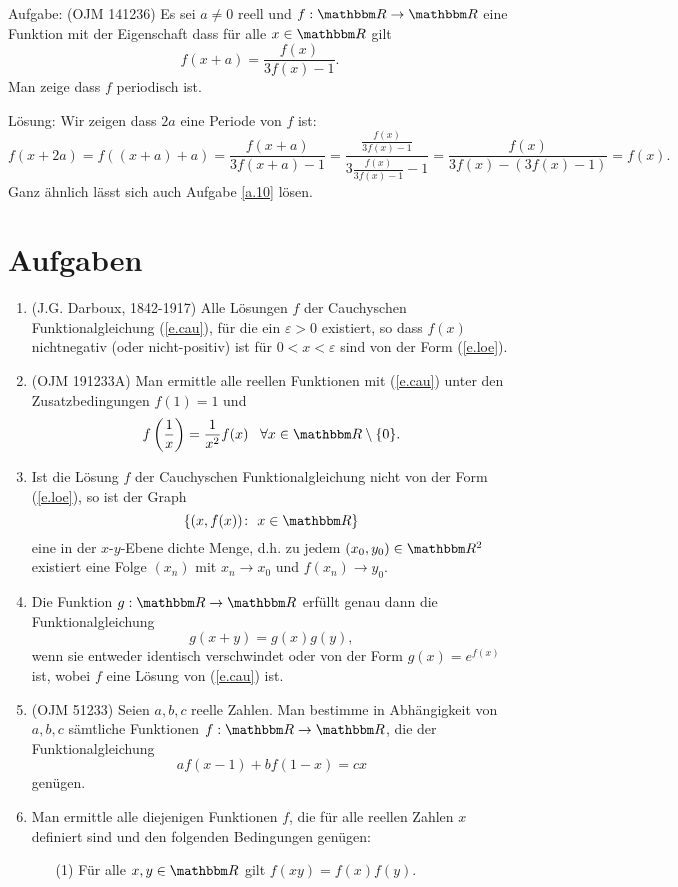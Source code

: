 \documentclass[11pt]{article}
\begin{document}
\noindent Aufgabe: (OJM 141236) Es sei $a\neq 0$ reell und $f:\R\to\R$ eine
Funktion mit der Eigenschaft da{ss} f\"{u}r alle $x\in\R$ gilt
\[f(x+a)=\frac{f(x)}{3f(x)-1}.\]
Man zeige  da{ss} $f$ periodisch ist.

L\"{o}sung: Wir zeigen da{ss} $2a$ eine Periode von $f$ ist:
\[f(x+2a)=f((x+a)+a)=\frac{f(x+a)}{3f(x+a)-1}
=\frac{\frac{f(x)}{3f(x)-1}}{3\frac{f(x)}{3f(x)-1}-1}
=\frac{f(x)}{3f(x)-(3f(x)-1)}=f(x).\] Ganz \"{a}hnlich l\"{a}{ss}t sich auch
Aufgabe \ref{a.10} l\"{o}sen.

\section{Aufgaben}
\begin{enumerate}
\item \label{a.1} (J.G. Darboux, 1842-1917) Alle L\"{o}sungen $f$ der
Cauchyschen Funktionalgleichung (\ref{e.cau}), f\"{u}r die ein $\varepsilon
>0$ existiert, so da{ss} $f(x)$ nichtnegativ (oder nicht-positiv) ist f\"{u}r
$0<x<\varepsilon$ sind von der Form (\ref{e.loe}).
\item (OJM 191233A) \label{a.3} Man ermittle alle reellen Funktionen mit
(\ref{e.cau}) unter den Zusatzbedingungen $f(1)=1$ und
\[f\br{\frac{1}{x}} =\frac{1}{x^2}f(x)\;\;\;\forall x\in\R\setminus \{0\}.\]
\item \label{a.2} Ist die L\"{o}sung $f$ der Cauchyschen Funktionalgleichung
nicht von der Form {\rm (\ref{e.loe})}, so ist der Graph
\[\{(x,f(x))\colon\ x\in \R \}\]
eine in der $x$-$y$-Ebene dichte Menge, d.h. zu jedem $(x_0,y_0)\in\R^2$
existiert eine Folge $(x_n)$ mit $x_n\to x_0$ und $f(x_n)\to y_0$.
\item \label{a.4} Die Funktion $g:\R\to\R$ erf\"{u}llt genau dann die
Funktionalgleichung
\[g(x+y)=g(x)g(y),\]
wenn sie entweder identisch verschwindet oder von der Form $g(x)=e^{f(x)}$
ist, wobei $f$ eine L\"{o}sung von (\ref{e.cau}) ist.
\item \label{a.6} (OJM 51233) Seien $a,b,c$ reelle Zahlen. Man bestimme in
Abh\"{a}ngigkeit von $a,b,c$ s\"{a}mtliche Funktionen $f:\R\to\R$, die der
Funktionalgleichung
\[af(x-1)+bf(1-x)=cx\]
gen\"{u}gen.
\item Man ermittle alle diejenigen Funktionen $f$, die f\"{u}r alle reellen
Zahlen $x$ definiert sind und den folgenden Bedingungen gen\"{u}gen:
\begin{enumerate}
  \item[(1)] F\"{u}r alle $x,y\in\R$ gilt $f(xy)=f(x)f(y)$.


\end{enumerate}
\end{enumerate}
\end{document}
